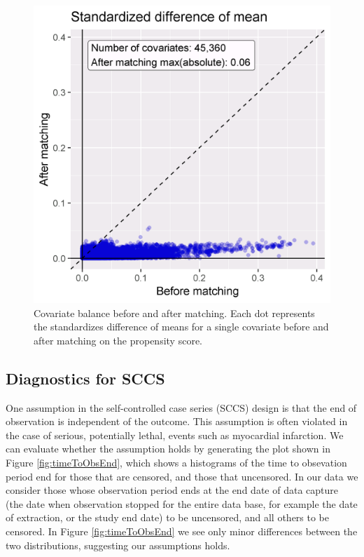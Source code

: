 \documentclass[]{book}
\begin{document}
\begin{figure}

{\centering \includegraphics[width=0.6\linewidth]{images/MethodValidity/balanceScatterplot} 

}

\caption{Covariate balance before and after matching. Each dot represents the standardizes difference of means for a single covariate before and after matching on the propensity score. }\label{fig:balanceScatterplot}
\end{figure}

\subsection{Diagnostics for SCCS}\label{diagnostics-for-sccs}

One assumption in the self-controlled case series (SCCS) design is that
the end of observation is independent of the outcome. This assumption is
often violated in the case of serious, potentially lethal, events such
as myocardial infarction. We can evaluate whether the assumption holds
by generating the plot shown in Figure \ref{fig:timeToObsEnd}, which
shows a histograms of the time to obsevation period end for those that
are censored, and those that uncensored. In our data we consider those
whose observation period ends at the end date of data capture (the date
when observation stopped for the entire data base, for example the date
of extraction, or the study end date) to be uncensored, and all others
to be censored. In Figure \ref{fig:timeToObsEnd} we see only minor
differences between the two distributions, suggesting our assumptions
holds.
\end{document}

